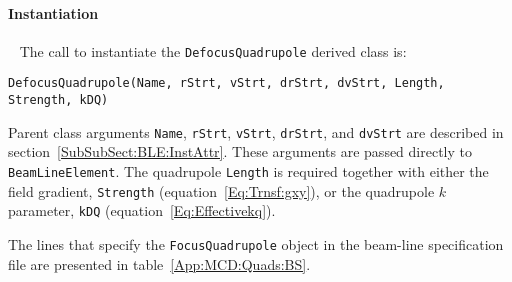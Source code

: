 \paragraph{Instantiation} ~\newline
\noindent
The call to instantiate the \texttt{DefocusQuadrupole} derived class is:
\begin{center}
  \texttt{DefocusQuadrupole(Name, rStrt, vStrt, drStrt, dvStrt, Length,
          Strength, kDQ)} 
\end{center}
Parent class arguments \texttt{Name}, \texttt{rStrt}, \texttt{vStrt},
\texttt{drStrt}, and \texttt{dvStrt} are described in
section~\ref{SubSubSect:BLE:InstAttr}.
These arguments are passed directly to \texttt{BeamLineElement}.
The quadrupole \texttt{Length} is required together with
either the field gradient, \texttt{Strength}
(equation~\ref{Eq:Trnsf:gxy}), or the quadrupole $k$
parameter, \texttt{kDQ} (equation~\ref{Eq:Effectivekq}).

The lines that specify the \texttt{FocusQuadrupole} object in the
beam-line specification file are presented in
table~\ref{App:MCD:Quads:BS}.

